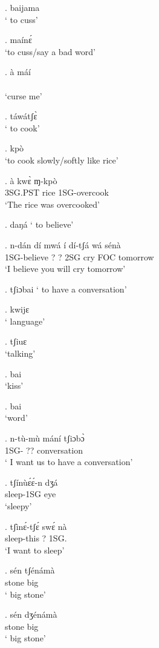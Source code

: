 \documentclass{assets/fieldnotes}
\begin{document}
\ex. baijama\\
` to cuss'

\ex. maínɛ́\\
`to cuss/say a bad word'

\exg. à máí\\
\\
`curse me'

\ex. táwátʃɛ̀\\
` to cook'

\ex. kpò\\
`to cook slowly/softly like rice'

\exg. à kwɛ̀ ɱ-kpò \\
3SG.PST rice  1SG-overcook\\
`The rice was overcooked'

\ex. daŋá
` to believe'

\exg. n-dán dí mwá í dí-tʃá wá sénà\\
1SG-believe  ?  ?  2SG  cry FOC  tomorrow\\
`I believe you will cry tomorrow'

\ex. tʃiɔbai
` to have a conversation'

\ex. kwijɛ\\
` language'

\ex. tʃiuɛ\\
`talking'

\ex. bai\\
`kiss'

\ex. bai\\
`word'

\exg. n-tù-mù mání tʃiɔbɔ̀\\
1SG- ??            conversation\\
` I want us to have a conversation'

\exg. tʃínùɛ́ɛ́-n dʒá\\
sleep-1SG eye\\
`sleepy'

\exg. tʃìnɛ́-tʃɛ́ swɛ́ nà\\
sleep-this ?    1SG.    \\
`I want to sleep'

\exg. sén tʃénámà\\
stone big\\
` big stone'

\exg. sén dʒénámà \\
 stone big\\
` big stone'
\end{document}
